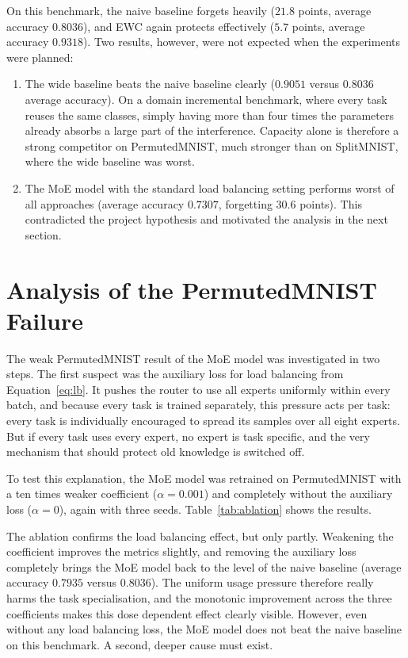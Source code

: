 On this benchmark, the naive baseline forgets heavily ($21.8$ points,
average accuracy $0.8036$), and EWC again protects effectively ($5.7$
points, average accuracy $0.9318$). Two results, however, were not expected
when the experiments were planned:

\begin{enumerate}[label=\textbf{F\arabic*.}, leftmargin=3em]
  \item The wide baseline beats the naive baseline clearly ($0.9051$
        versus $0.8036$ average accuracy). On a domain incremental
        benchmark, where every task reuses the same classes, simply having
        more than four times the parameters already absorbs a large part of
        the interference. Capacity alone is therefore a strong competitor
        on PermutedMNIST, much stronger than on SplitMNIST, where the wide
        baseline was worst.
  \item The MoE model with the standard load balancing setting performs
        worst of all approaches (average accuracy $0.7307$, forgetting
        $30.6$ points). This contradicted the project hypothesis and
        motivated the analysis in the next section.
\end{enumerate}

\section{Analysis of the PermutedMNIST Failure}
\label{sec:ablation}

The weak PermutedMNIST result of the MoE model was investigated in two
steps. The first suspect was the auxiliary loss for load balancing from
Equation~\eqref{eq:lb}. It pushes the router to use all experts uniformly
within every batch, and because every task is trained separately, this
pressure acts per task: every task is individually encouraged to spread its
samples over all eight experts. But if every task uses every expert, no
expert is task specific, and the very mechanism that should protect old
knowledge is switched off.

To test this explanation, the MoE model was retrained on PermutedMNIST with
a ten times weaker coefficient ($\alpha = 0.001$) and completely without
the auxiliary loss ($\alpha = 0$), again with three seeds. Table~\ref{tab:ablation} shows
the results.



The ablation confirms the load balancing effect, but only partly.
Weakening the coefficient improves the metrics slightly, and removing the
auxiliary loss completely brings the MoE model back to the level of the
naive baseline (average accuracy $0.7935$ versus $0.8036$). The uniform
usage pressure therefore really harms the task specialisation, and the
monotonic improvement across the three coefficients makes this dose
dependent effect clearly visible. However, even without any load balancing
loss, the MoE model does not beat the naive baseline on this benchmark. A
second, deeper cause must exist.

